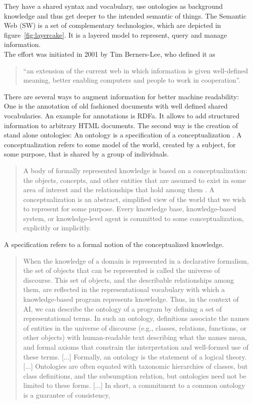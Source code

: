 They have a shared syntax and vocabulary, use ontologies as background knowledge and thus get deeper to the intended semantic of things.
The Semantic Web (SW) is a set of complementary technologies, which are depicted in figure~\ref{fig:layercake}. 
It is a layered model to represent, query and manage information.\\
The effort was initiated in 2001 by Tim Berners-Lee, who defined it as 
\begin{quote}
"`an extension of the current web in which information is given well-defined
meaning, better enabling computers and people to work in cooperation"'.
\cite{berners}
\end{quote}
There are several ways to augment information for better machine readability: 
One is the annotation of old fashioned documents with well defined shared vocabularies. 
An example for annotations is RDFa. 
It allows to add structured information to arbitrary HTML documents. 
The second way is the creation of stand alone ontologies: An ontology is a specification of a conceptualization \cite{gruber}.
A conceptualization refers to some model of the world, created by a subject, for some purpose, that is shared by a group of individuals.
\begin{quote}
A body of formally represented knowledge is based on a conceptualization: the objects, concepts, and other entities that are assumed to exist in some area of interest and the relationships that hold among them \cite{genesereth}. 
A conceptualization is an abstract, simplified view of the world that we wish to represent for some purpose. 
Every knowledge base, knowledge-based system, or knowledge-level agent is committed to some conceptualization, explicitly or implicitly. \cite{gruber}
\end{quote}
A specification refers to a formal notion of the conceptualized knowledge.
\begin{quote}
When the knowledge of a domain is represented in a declarative formalism, the set of objects that can be represented is called the universe of discourse. 
This set of objects, and the describable relationships among them, are reflected in the representational vocabulary with which a knowledge-based program represents knowledge. 
Thus, in the context of AI, we can describe the ontology of a program by defining a set of representational terms. 
In such an ontology, definitions associate the names of entities in the universe of discourse (e.g., classes, relations, functions, or other objects) with human-readable text describing what the names mean, and formal axioms that constrain the interpretation and well-formed use of these terms. 
[...]
Formally, an ontology is the statement of a logical theory. 
[...]
Ontologies are often equated with taxonomic hierarchies of classes, but class definitions, and the subsumption relation, but ontologies need not be limited to these forms.
[...]
In short, a commitment to a common ontology is a guarantee of consistency,
\cite{gruber}
\end{quote}

